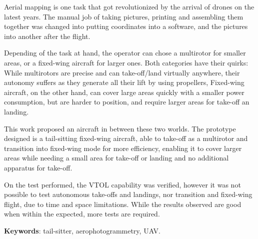 \begin{resumo}[Abstract]

Aerial mapping is one task that got revolutionized by the arrival of drones on the latest years. The manual job of taking pictures, printing and assembling them together was changed into putting coordinates into a software, and the pictures into another after the flight.

Depending of the task at hand, the operator can chose a multirotor for smaller areas, or a fixed-wing aircraft for larger ones. Both categories have their quirks: While multirotors are precise and can take-off/land virtually anywhere, their autonomy suffers as they generate all their lift by using propellers, Fixed-wing aircraft, on the other hand, can cover large areas quickly with a smaller power consumption, but are harder to position, and require larger areas for take-off an landing.
 
This work proposed an aircraft in between these two worlds. The prototype designed is a tail-sitting fixed-wing aircraft, able to take-off as a multirotor and transition into fixed-wing mode for more efficiency, enabling it to cover larger areas while needing a small area for take-off or landing and no additional apparatus for take-off.	

On the test performed, the VTOL capability was verified, however it was not possible to test autonomous take-offs and landings, nor transition and fixed-wing flight, due to time and space limitations. While the results observed are good when within the expected, more tests are required. 

   \vspace{\onelineskip}
 
   \noindent 
   \textbf{Keywords}: tail-sitter, aerophotogrammetry, UAV.

\end{resumo}
